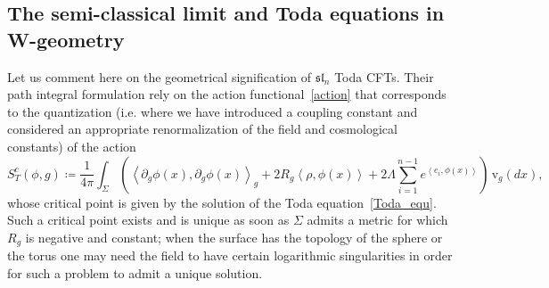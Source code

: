 \documentclass[AHL,Unicode,longabstracts,published]{cedram}
\newcommand{\frksl}{\mathfrak{sl}}
\newcommand{\rmv}{\mathrm{v}}
\newcommand*\green[1]{#1}
\begin{document}
\subsection{The semi-classical limit and Toda equations in W-geometry}\label{semi-classical}
Let us comment here on the geometrical signification of $\frksl_n$ Toda CFTs. Their path integral formulation rely on the action functional~\eqref{action} that corresponds to the quantization (i.e. where we have introduced a coupling constant and considered an appropriate renormalization of the field and cosmological constants) of the action
\[
S^c_T(\green\phi,g)\coloneqq \frac{1}{4\pi} \int_{\Sigma} \left(\left\langle\partial_g \phi(x), \partial_g \phi(x) \right\rangle_g +2 R_g \left\langle \rho, \phi(x) \right\rangle +2\Lambda \sum_{i=1}^{n-1} e^{\left\langle e_i,\phi(x) \right\rangle} \right)\,\rmv_{g}(dx),
\]
whose critical point is given by the solution of the Toda equation~\eqref{Toda_equ}. Such a critical point exists and is unique as soon as $\Sigma$ admits a metric for which $R_g$ is negative and constant; when the surface has the topology of the sphere or the torus one may need the field to have certain logarithmic singularities in order for such a problem to admit a unique solution.
\end{document}
